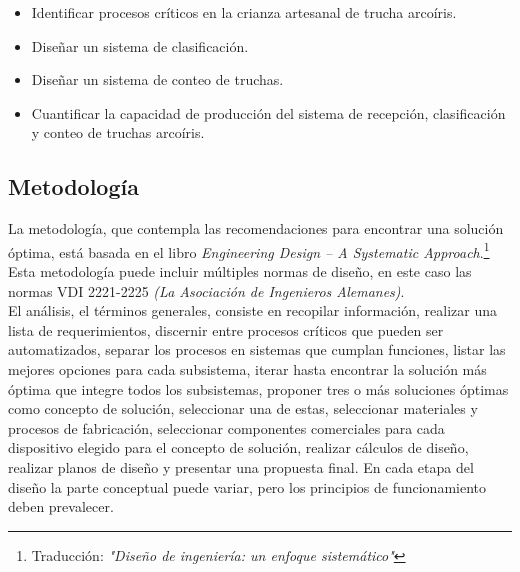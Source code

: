 \begin{itemize}
\item Identificar procesos críticos en la crianza artesanal de trucha arcoíris.
\item Diseñar un sistema de clasificación.
\item Diseñar un sistema de conteo de truchas.
\item Cuantificar la capacidad de producción del sistema de recepción, clasificación y conteo de truchas arcoíris.
\end{itemize}

\subsection{Metodología}

La metodología, que contempla las recomendaciones para encontrar una solución óptima, está basada en el libro \textit{Engineering Design – A Systematic Approach}.\footnote{Traducción: \textit{"Diseño de ingeniería: un enfoque sistemático"}}  Esta metodología puede incluir múltiples normas de diseño, en este caso las normas VDI 2221-2225 \textit{(La Asociación de Ingenieros Alemanes)}.  \\
El análisis, el términos generales, consiste en recopilar información, realizar una lista de requerimientos, discernir entre procesos críticos que pueden ser automatizados, separar los procesos en sistemas que cumplan funciones, listar las mejores opciones para cada subsistema, iterar hasta encontrar la solución más óptima que integre todos los subsistemas, proponer tres o más soluciones óptimas como concepto de solución, seleccionar una de estas, seleccionar materiales y procesos de fabricación, seleccionar componentes comerciales para cada dispositivo elegido para el concepto de solución, realizar cálculos de diseño, realizar planos de diseño y presentar una propuesta final. En cada etapa del diseño la parte conceptual puede variar, pero los principios de funcionamiento deben prevalecer.\\

